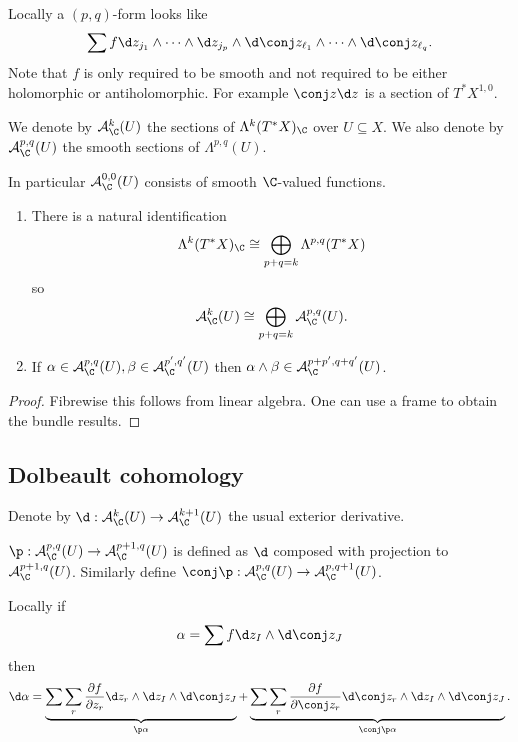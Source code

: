 \documentclass[a4paper]{article}
\newcommand{\w}{\wedge} %
\begin{document}
Locally a \((p, q)\)-form looks like
\[
  \sum f \d z_{j_1} \w \cdots \w \d z_{j_p} \w \d\conj z_{\ell_1} \w \cdots \w \d\conj z_{\ell_q}.
\]
Note that \(f\) is only required to be smooth and not required to be either holomorphic or antiholomorphic. For example \(\conj z \d z\) is a section of \(T^*X^{1, 0}\).

\begin{definition}
  We denote by \(\mathcal A_\C^k(U)\) the sections of \(\Lambda^k(T^*X)_\C\) over \(U \subseteq X\). We also denote by \(\mathcal A_\C^{p, q}(U)\) the smooth sections of \(\Lambda^{p, q}(U)\).
\end{definition}
In particular \(\mathcal A_\C^{0, 0}(U)\) consists of smooth \(\C\)-valued functions.

\begin{lemma}\leavevmode
  \begin{enumerate}
  \item There is a natural identification
    \[
      \Lambda^k(T^*X)_\C \cong \bigoplus_{p + q = k} \Lambda^{p, q} (T^*X)
    \]
    so
    \[
      \mathcal A_\C^k(U) \cong \bigoplus_{p + q = k} \mathcal A_\C^{p, q} (U).
    \]
  \item If \(\alpha \in \mathcal A_\C^{p, q}(U), \beta \in \mathcal A_\C^{p', q'}(U)\) then \(\alpha \w \beta \in \mathcal A_\C^{p + p', q + q'}(U)\).
  \end{enumerate}
\end{lemma}

\begin{proof}
  Fibrewise this follows from linear algebra. One can use a frame to obtain the bundle results.
\end{proof}

\subsection{Dolbeault cohomology}

Denote by \(\d: \mathcal A_\C^k(U) \to \mathcal A_\C^{k + 1}(U)\) the usual exterior derivative.

\begin{definition}
  \(\p: \mathcal A_\C^{p, q}(U) \to \mathcal A_\C^{p + 1, q}(U)\) is defined as \(\d\) composed with projection to \(\mathcal A_\C^{p + 1, q}(U)\). Similarly define \(\conj \p: \mathcal A_\C^{p, q}(U) \to \mathcal A_\C^{p, q + 1}(U)\).
\end{definition}

Locally if
\[
  \alpha = \sum f \d z_I \w \d \conj z_J
\]
then
\[
  \d \alpha = \underbrace{\sum \sum_r \frac{\partial f}{\partial z_r} \d z_r \w \d z_I \w \d \conj z_J}_{\p \alpha} + \underbrace{\sum \sum_r \frac{\partial f}{\partial \conj z_r} \d \conj z_r \w \d z_I \w \d \conj z_J}_{\conj \p \alpha}.
\]
\end{document}
